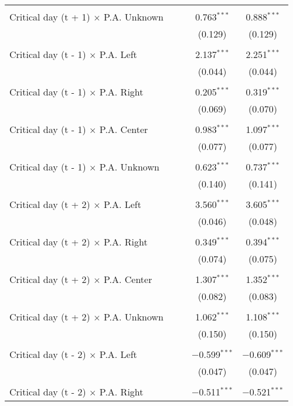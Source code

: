 \documentclass[
]{article}
\begin{document}
\begin{table}[!htbp]
{\begin{tabular}{@{\extracolsep{5pt}}lcccc}
  & & & & \\ 
 Critical day (t + 1) $\times$ P.A. Unknown &  &  & 0.763$^{***}$ & 0.888$^{***}$ \\ 
  &  &  & (0.129) & (0.129) \\ 
  & & & & \\ 
 Critical day (t - 1) $\times$ P.A. Left &  &  & 2.137$^{***}$ & 2.251$^{***}$ \\ 
  &  &  & (0.044) & (0.044) \\ 
  & & & & \\ 
 Critical day (t - 1) $\times$ P.A. Right &  &  & 0.205$^{***}$ & 0.319$^{***}$ \\ 
  &  &  & (0.069) & (0.070) \\ 
  & & & & \\ 
 Critical day (t - 1) $\times$ P.A. Center &  &  & 0.983$^{***}$ & 1.097$^{***}$ \\ 
  &  &  & (0.077) & (0.077) \\ 
  & & & & \\ 
 Critical day (t - 1) $\times$ P.A. Unknown &  &  & 0.623$^{***}$ & 0.737$^{***}$ \\ 
  &  &  & (0.140) & (0.141) \\ 
  & & & & \\ 
 Critical day (t + 2) $\times$ P.A. Left &  &  & 3.560$^{***}$ & 3.605$^{***}$ \\ 
  &  &  & (0.046) & (0.048) \\ 
  & & & & \\ 
 Critical day (t + 2) $\times$ P.A. Right &  &  & 0.349$^{***}$ & 0.394$^{***}$ \\ 
  &  &  & (0.074) & (0.075) \\ 
  & & & & \\ 
 Critical day (t + 2) $\times$ P.A. Center &  &  & 1.307$^{***}$ & 1.352$^{***}$ \\ 
  &  &  & (0.082) & (0.083) \\ 
  & & & & \\ 
 Critical day (t + 2) $\times$ P.A. Unknown &  &  & 1.062$^{***}$ & 1.108$^{***}$ \\ 
  &  &  & (0.150) & (0.150) \\ 
  & & & & \\ 
 Critical day (t - 2) $\times$ P.A. Left &  &  & $-$0.599$^{***}$ & $-$0.609$^{***}$ \\ 
  &  &  & (0.047) & (0.047) \\ 
  & & & & \\ 
 Critical day (t - 2) $\times$ P.A. Right &  &  & $-$0.511$^{***}$ & $-$0.521$^{***}$ \\ 

\end{tabular}}
\end{table}
\end{document}
